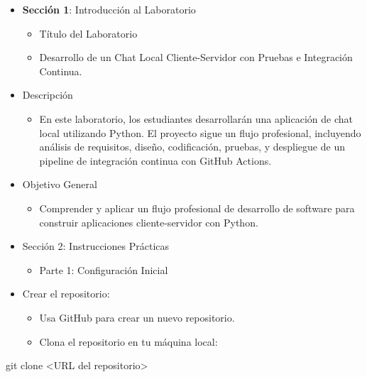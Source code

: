 \documentclass[
  a4paper,
  DIV=11,
  numbers=noendperiod,
  onepage,
  openany]{scrreprt}
\newenvironment{Shaded}{\begin{snugshade}}{\end{snugshade}}
\newcommand{\FunctionTok}[1]{\textcolor[rgb]{0.28,0.35,0.67}{#1}}
\newcommand{\NormalTok}[1]{\textcolor[rgb]{0.00,0.23,0.31}{#1}}
\newcommand{\OperatorTok}[1]{\textcolor[rgb]{0.37,0.37,0.37}{#1}}
\providecommand{\tightlist}{%
  \setlength{\itemsep}{0pt}\setlength{\parskip}{0pt}}\usepackage{longtable,booktabs,array}
\begin{document}
\begin{itemize}
\item
  \textbf{Sección 1}: Introducción al Laboratorio

  \begin{itemize}
  \tightlist
  \item
    Título del Laboratorio
  \item
    Desarrollo de un Chat Local Cliente-Servidor con Pruebas e
    Integración Continua.
  \end{itemize}
\item
  Descripción

  \begin{itemize}
  \tightlist
  \item
    En este laboratorio, los estudiantes desarrollarán una aplicación de
    chat local utilizando Python. El proyecto sigue un flujo
    profesional, incluyendo análisis de requisitos, diseño,
    codificación, pruebas, y despliegue de un pipeline de integración
    continua con GitHub Actions.
  \end{itemize}
\item
  Objetivo General

  \begin{itemize}
  \tightlist
  \item
    Comprender y aplicar un flujo profesional de desarrollo de software
    para construir aplicaciones cliente-servidor con Python.
  \end{itemize}
\item
  Sección 2: Instrucciones Prácticas

  \begin{itemize}
  \tightlist
  \item
    Parte 1: Configuración Inicial
  \end{itemize}
\item
  Crear el repositorio:

  \begin{itemize}
  \tightlist
  \item
    Usa GitHub para crear un nuevo repositorio.
  \item
    Clona el repositorio en tu máquina local:
  \end{itemize}
\end{itemize}

\begin{Shaded}
\begin{Highlighting}[]
\FunctionTok{git}\NormalTok{ clone }\OperatorTok{\textless{}}\NormalTok{URL del repositorio}\OperatorTok{\textgreater{}}
\end{Highlighting}
\end{Shaded}
\end{document}
